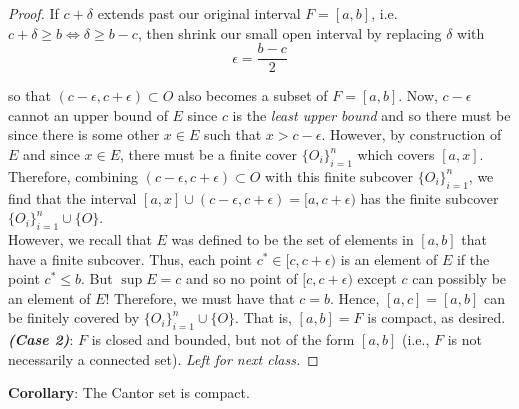 \documentclass[12pt]{article}
\newlength\tindent
\renewcommand{\indent}{\hspace*{\tindent}}
\begin{document}
\begin{proof}
\indent If $c + \delta$ extends past our original interval $F = [a,b]$, i.e. $c + \delta \geq b \iff \delta \geq b - c$, then shrink our small open interval by replacing $\delta$ with
\begin{equation*}
	\epsilon = \frac{b - c}{2}
\end{equation*}

so that $(c - \epsilon, c + \epsilon) \subset O$ also becomes a subset of $F = [a,b]$. Now, $c - \epsilon$ cannot an upper bound of $E$ since $c$ is the {\em least upper bound} and so there must be since there is some other $x \in E$ such that $x > c - \epsilon$. However, by construction of $E$ and since $x \in E$, there must be a finite cover $\{O_i\}^n_{i = 1}$ which covers $[a,x]$. \\

\indent Therefore, combining $(c - \epsilon, c + \epsilon) \subset O$ with this finite subcover $\{O_i\}^n_{i = 1}$, we find that the interval $[a, x] \cup (c - \epsilon, c + \epsilon) = [a, c + \epsilon)$ has the finite subcover $\{O_i\}^n_{i = 1} \cup \{O\}$. \\

\indent However, we recall that $E$ was defined to be the set of elements in $[a,b]$ that have a finite subcover. Thus, each point $c^* \in [c, c + \epsilon)$ is an element of $E$ if the point $c^* \leq b$. But $\sup E = c$ and so no point of $[c, c + \epsilon)$ except $c$ can possibly be an element of $E$! Therefore, we must have that $c = b$. Hence, $[a,c] = [a,b]$ can be finitely covered by $\{O_i\}^n_{i = 1} \cup \{O\}$. That is, $[a,b] = F$ is compact, as desired. \\

{\bf \em (Case 2)}: $F$ is closed and bounded, but not of the form $[a,b]$ (i.e., $F$ is not necessarily a connected set). {\em Left for next class.}
\end{proof}

%
%
{\bf Corollary}: The Cantor set is compact.
\end{document}
